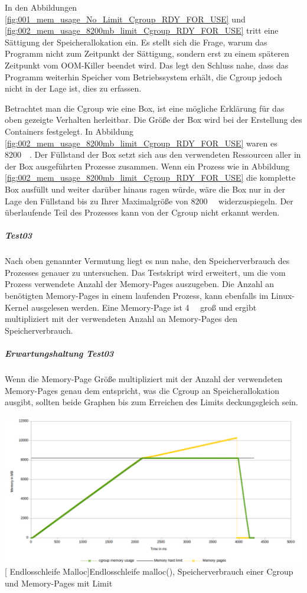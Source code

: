 In den Abbildungen \ref{fig:001_mem_usage_No_Limit_Cgroup_RDY_FOR_USE} und \ref{fig:002_mem_usage_8200mb_limit_Cgroup_RDY_FOR_USE} tritt eine Sättigung der Speicherallokation ein. Es stellt sich die Frage, warum das Programm nicht zum Zeitpunkt der Sättigung, sondern erst zu einem späteren Zeitpunkt vom OOM-Killer beendet wird. Das legt den Schluss nahe, dass das Programm weiterhin Speicher vom Betriebssystem erhält, die Cgroup jedoch nicht in der Lage ist, dies zu erfassen. 

Betrachtet man die Cgroup wie eine Box, ist eine mögliche Erklärung für das oben gezeigte Verhalten herleitbar. Die Größe der Box wird bei der Erstellung des Containers festgelegt. In Abbildung \ref{fig:002_mem_usage_8200mb_limit_Cgroup_RDY_FOR_USE} waren es \SI{8200}{\mega\byte}. Der Füllstand der Box setzt sich aus den verwendeten Ressourcen aller in der Box ausgeführten Prozesse zusammen. Wenn ein Prozess wie in Abbildung \ref{fig:002_mem_usage_8200mb_limit_Cgroup_RDY_FOR_USE} die komplette Box ausfüllt und weiter darüber hinaus ragen würde, wäre die Box nur in der Lage den Füllstand bis zu Ihrer Maximalgröße von \SI{8200}{\mega\byte} widerzuspiegeln. Der überlaufende Teil des Prozesses kann von der Cgroup nicht erkannt werden.

\subparagraph{Test03}
Nach oben genannter Vermutung liegt es nun nahe, den Speicherverbrauch des Prozesses genauer zu untersuchen. Das Testskript wird erweitert, um die vom Prozess verwendete Anzahl der Memory-Pages auszugeben. Die Anzahl an benötigten Memory-Pages in einem laufenden Prozess, kann ebenfalls im Linux-Kernel ausgelesen werden. Eine Memory-Page ist \SI{4}{\kilo\byte} groß und ergibt multipliziert mit der verwendeten Anzahl an Memory-Pages den Speicherverbrauch.

\subparagraph{Erwartungshaltung Test03}
Wenn die Memory-Page Größe multipliziert mit der Anzahl der verwendeten Memory-Pages genau dem entspricht, was die Cgroup an Speicherallokation ausgibt, sollten beide Graphen bis zum Erreichen des Limits deckungsgleich sein.

\vspace{1em}
\begin{minipage}{\linewidth}
	\centering
	\includegraphics[width=1\linewidth]{pics/003_mem_usage_8200mb_limit_Cgroup_Pages_RDY_FOR_USE.png}
	[ Endlosschleife Malloc]{Endlosschleife malloc(), Speicherverbrauch einer Cgroup und Memory-Pages mit Limit}
	\label{fig:003_mem_usage_8200mb_limit_Cgroup_Pages_RDY_FOR_USE}
\end{minipage}

